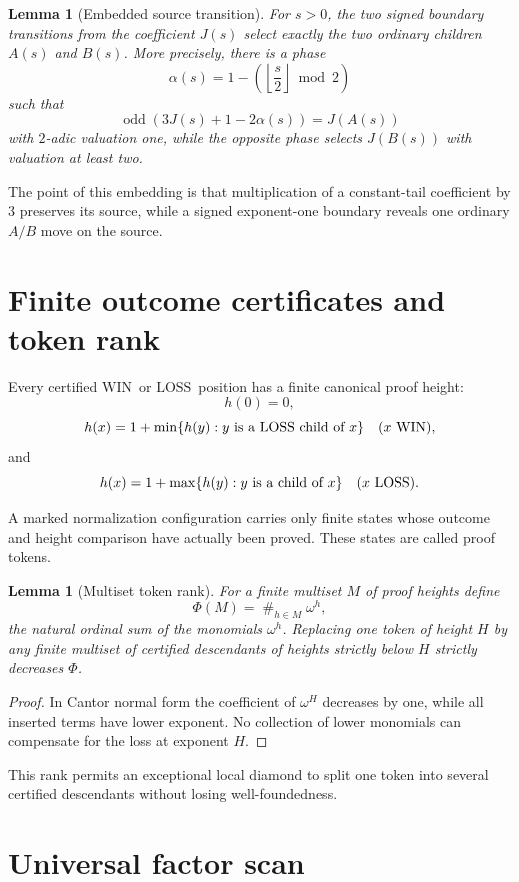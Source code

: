 \documentclass[11pt]{article}
\newtheorem{lemma}[theorem]{Lemma}
\newcommand{\WIN}{\ensuremath{\mathrm{WIN}}}
\newcommand{\LOSS}{\ensuremath{\mathrm{LOSS}}}
\newcommand{\PhiM}{\Phi}
\newcommand{\odd}{\operatorname{odd}}
\begin{document}
\begin{lemma}[Embedded source transition]\label{lem:source-transition}
For $s>0$, the two signed boundary transitions from the coefficient $J(s)$
select exactly the two ordinary children $A(s)$ and $B(s)$. More precisely,
there is a phase
\[
 \alpha(s)=1-\left(\left\lfloor\frac s2\right\rfloor\bmod2\right)
\]
such that
\[
 \odd(3J(s)+1-2\alpha(s))=J(A(s))
\]
with $2$-adic valuation one, while the opposite phase selects $J(B(s))$ with
valuation at least two.
\end{lemma}

The point of this embedding is that multiplication of a constant-tail
coefficient by $3$ preserves its source, while a signed exponent-one boundary
reveals one ordinary $A/B$ move on the source.

\section{Finite outcome certificates and token rank}

Every certified \WIN\ or \LOSS\ position has a finite canonical proof height:
\[
 h(0)=0,
\]
\[
 h(x)=1+\min\{h(y):y\text{ is a \LOSS\ child of }x\}
 \quad(x\text{ \WIN}),
\]
and
\[
 h(x)=1+\max\{h(y):y\text{ is a child of }x\}
 \quad(x\text{ \LOSS}).
\]

A marked normalization configuration carries only finite states whose outcome
and height comparison have actually been proved. These states are called proof
tokens.

\begin{lemma}[Multiset token rank]\label{lem:multiset}
For a finite multiset $M$ of proof heights define
\[
 \PhiM(M)=\mathop{\#}_{h\in M}\omega^h,
\]
the natural ordinal sum of the monomials $\omega^h$. Replacing one token of
height $H$ by any finite multiset of certified descendants of heights strictly
below $H$ strictly decreases $\PhiM$.
\end{lemma}

\begin{proof}
In Cantor normal form the coefficient of $\omega^H$ decreases by one, while
all inserted terms have lower exponent. No collection of lower monomials can
compensate for the loss at exponent $H$.
\end{proof}

This rank permits an exceptional local diamond to split one token into several
certified descendants without losing well-foundedness.

\section{Universal factor scan}
\end{document}
